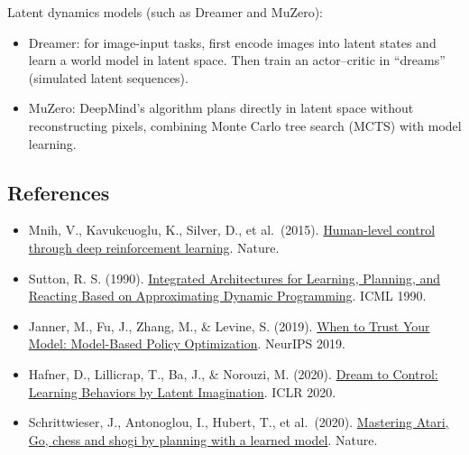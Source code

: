 Latent dynamics models (such as Dreamer and MuZero):

\begin{itemize}
\tightlist
\item
  Dreamer: for image-input tasks, first encode images into latent states and learn a world model in latent space. Then train an actor--critic in ``dreams'' (simulated latent sequences).
\item
  MuZero: DeepMind's algorithm plans directly in latent space without reconstructing pixels, combining Monte Carlo tree search (MCTS) with model learning.
\end{itemize}

\FloatBarrier
{}
\hypertarget{references-53}{%
\subsection{References}\label{references-53}}

\vspace{0.25em}
\begin{itemize}
\tightlist
\item
  Mnih, V., Kavukcuoglu, K., Silver, D., et al.~(2015). \href{https://doi.org/10.1038/nature14236}{Human-level control through deep reinforcement learning}. Nature.
\item
  Sutton, R. S. (1990). \href{https://doi.org/10.1016/B978-1-55860-141-3.50030-4}{Integrated Architectures for Learning, Planning, and Reacting Based on Approximating Dynamic Programming}. ICML 1990.
\item
  Janner, M., Fu, J., Zhang, M., \& Levine, S. (2019). \href{https://arxiv.org/abs/1906.08253}{When to Trust Your Model: Model-Based Policy Optimization}. NeurIPS 2019.
\item
  Hafner, D., Lillicrap, T., Ba, J., \& Norouzi, M. (2020). \href{https://openreview.net/forum?id=S1lOTC4tDS}{Dream to Control: Learning Behaviors by Latent Imagination}. ICLR 2020.
\item
  Schrittwieser, J., Antonoglou, I., Hubert, T., et al.~(2020). \href{https://doi.org/10.1038/s41586-020-03051-4}{Mastering Atari, Go, chess and shogi by planning with a learned model}. Nature.
\end{itemize}

\clearpage
